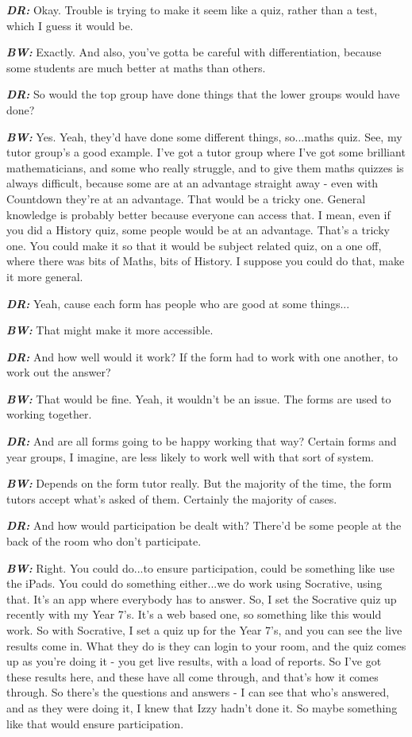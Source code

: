 \textit{\textbf{DR:}} Okay. Trouble is trying to make it seem like a quiz, rather than a test, which I guess it would be.

\textit{\textbf{BW:}} Exactly. And also, you've gotta be careful with differentiation, because some students are much better at maths than others.

\textit{\textbf{DR:}} So would the top group have done things that the lower groups would have done?

\textit{\textbf{BW:}} Yes. Yeah, they'd have done some different things, so...maths quiz. See, my tutor group's a good example. I've got a tutor group where I've got some brilliant mathematicians, and some who really struggle, and to give them maths quizzes is always difficult, because some are at an advantage straight away - even with Countdown they're at an advantage. That would be a tricky one. General knowledge is probably better because everyone can access that. I mean, even if you did a History quiz, some people would be at an advantage. That's a tricky one. You could make it so that it would be subject related quiz, on a one off, where there was bits of Maths, bits of History. I suppose you could do that, make it more general.

\textit{\textbf{DR:}} Yeah, cause each form has people who are good at some things...

\textit{\textbf{BW:}} That might make it more accessible.

\textit{\textbf{DR:}} And how well would it work? If the form had to work with one another, to work out the answer?

\textit{\textbf{BW:}} That would be fine. Yeah, it wouldn't be an issue. The forms are used to working together.

\textit{\textbf{DR:}} And are all forms going to be happy working that way? Certain forms and year groups, I imagine, are less likely to work well with that sort of system.

\textit{\textbf{BW:}} Depends on the form tutor really. But the majority of the time, the form tutors accept what's asked of them. Certainly the majority of cases.

\textit{\textbf{DR:}} And how would participation be dealt with? There'd be some people at the back of the room who don't participate.

\textit{\textbf{BW:}} Right. You could do...to ensure participation, could be something like use the iPads. You could do something either...we do work using Socrative, using that. It's an app where everybody has to answer. So, I set the Socrative quiz up recently with my Year 7's. It's a web based one, so something like this would work. So with Socrative, I set a quiz up for the Year 7's, and you can see the live results come in. What they do is they can login to your room, and the quiz comes up as you're doing it - you get live results, with a load of reports. So I've got these results here, and these have all come through, and that's how it comes through. So there's the questions and answers - I can see that who's answered, and as they were doing it, I knew that Izzy hadn't done it. So maybe something like that would ensure participation.

